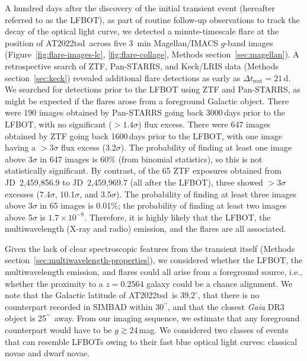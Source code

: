 \documentclass{nature_plusfigure}
\newcommand{\at}{AT2022tsd}
\newcommand{\arcsec}{$^{\prime\prime}$}
\begin{document}
\begin{methods}
A hundred days after the discovery of the initial transient event (hereafter referred to as the LFBOT), as part of routine follow-up observations to track the decay of the optical light curve, we detected\cite{Ho2022_Astronote_Flares} a minute-timescale flare at the position of \at\ across five 3~min Magellan/IMACS $g$-band images (Figure~\ref{fig:flare-images-lc}, \ref{fig:flare-collage}, Methods section~\ref{sec:magellan}). A retrospective search of ZTF, Pan-STARRS, and Keck/LRIS data (Methods section~\ref{sec:keck}) revealed additional flare detections as early as $\Delta t_\mathrm{rest}=21\,$d. We searched for detections prior to the LFBOT using ZTF and Pan-STARRS, as might be expected if the flares arose from a foreground Galactic object. There were 190 images obtained by Pan-STARRS going back 3000\,days prior to the LFBOT, with no significant ($>1.4\sigma$) flux excess\cite{Fulton2022}. There were 647 images obtained by ZTF going back 1600\,days prior to the LFBOT, with one image having a $>3\sigma$ flux excess (3.2$\sigma$). The probability of finding at least one image above 3$\sigma$ in 647 images is 60\% (from binomial statistics), so this is not statistically significant. By contrast, of the 65 ZTF exposures obtained from JD~2,459,856.9 to JD~2,459,969.7 (all after the LFBOT), three showed $>3\sigma$ excesses (7.4$\sigma$, 10.1$\sigma$, and 3.5$\sigma$). The probability of finding at least three images above 3$\sigma$ in 65 images is 0.01\%; the probability of finding at least two images above 5$\sigma$ is $1.7\times10^{-8}$. Therefore, it is highly likely that the LFBOT, the multiwavelength (X-ray and radio) emission, and the flares are all associated. 


Given the lack of clear spectroscopic features from the transient itself (Methods section~\ref{sec:multiwavelength-properties}), we considered whether the LFBOT, the multiwavelength emission, and flares could all arise from a foreground source, i.e., whether the proximity to a $z=0.2564$ galaxy could be a chance alignment. 
We note that the Galactic latitude of \at\ is $39.2^\circ$, that there is no counterpart recorded in SIMBAD within 30\arcsec, and that the closest {\it Gaia} DR3 object is 25\arcsec\ away. From our imaging sequence, we estimate that any foreground counterpart would have to be $g \gtrsim 24\,$mag. We considered two classes of events that can resemble LFBOTs owing to their fast blue optical light curves: classical novae and dwarf novae.


\end{methods}
\end{document}

